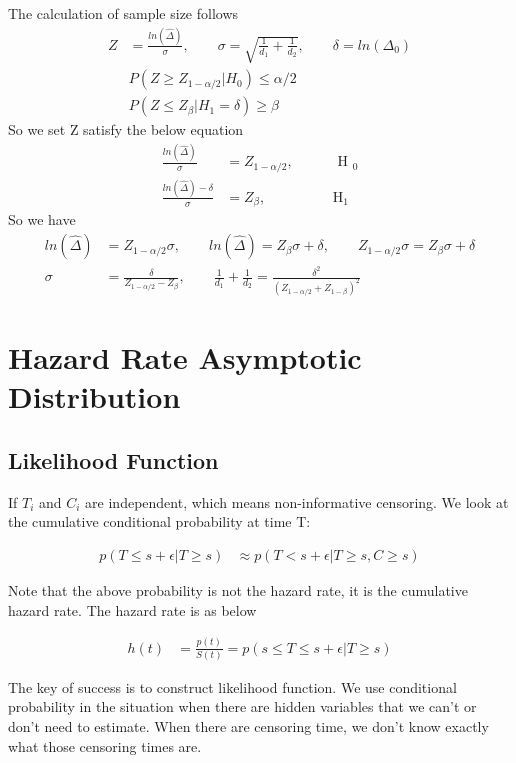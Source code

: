 \documentclass[11pt]{article} %
\begin{document}
The calculation of sample size follows
\begin{align*}
	Z &= \frac{ln(\hat{\Delta})}{\sigma}, \qquad \sigma = \sqrt{\frac{1}{d_1} + \frac{1}{d_2}}, \qquad \delta = ln(\Delta_0) \\
 &	P(Z \geq Z_{1-\alpha/2}| H_0)  \leq \alpha/2 \\
 &	P(Z \leq Z_{\beta}| H_1= \delta)  \geq \beta
\end{align*}
So we set Z satisfy the below equation
\begin{align*}
	\frac{ln(\hat{\Delta})}{\sigma} &= Z_{1-\alpha/2}, \qquad &\text{ H }_0\\
	\frac{ln(\hat{\Delta}) - \delta}{\sigma} &= Z_{\beta},  \qquad &\text{H}_1
\end{align*}
So we have
\begin{align*}
	ln(\hat{\Delta}) &= Z_{1-\alpha/2} \sigma, \qquad	ln(\hat{\Delta}) = Z_{\beta} {\sigma} + \delta ,\qquad	Z_{1-\alpha/2} \sigma = Z_{\beta} {\sigma} + \delta \\
	\sigma &= \frac{\delta}{Z_{1-\alpha/2} - Z_{\beta}}, \qquad 	\frac{1}{d_1} + \frac{1}{d_2} = \frac{\delta^2}{(Z_{1-\alpha/2} + Z_{1-\beta})^2}
\end{align*}

\section{Hazard Rate Asymptotic Distribution}

\subsection{Likelihood Function}
If $T_i$ and $C_i$ are independent, which means non-informative censoring. We look at the cumulative conditional probability at time T:

\begin{align*}
	p(T \leq s + \epsilon | T \geq s) & \approx p(T < s+ \epsilon | T \geq s, C \geq s)
\end{align*}

Note that the above probability is not the hazard rate, it is the cumulative hazard rate. The hazard rate is as below

\begin{align*}
	 h(t) & = \frac{p(t)}{S(t)} = p( s \leq T \leq s + \epsilon | T \geq s)
\end{align*}

The key of success is to construct likelihood function. We use conditional probability in the situation when there are hidden variables that we can't or don't need to estimate. When there are censoring time, we don't know exactly what those censoring times are.
\end{document}

